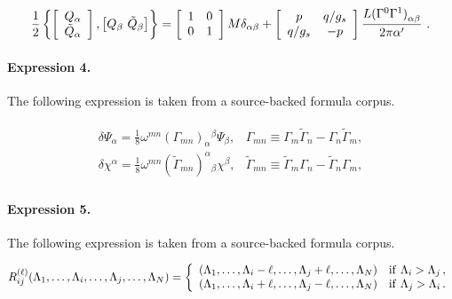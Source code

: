 \documentclass[11pt]{article}
\begin{document}
\begin{align*}{1\over2} \left\{ \left[ \begin{array}{c} Q_\alpha \\ \tilde Q_\alpha \end{array}\right] , \left[ Q_\beta\ \tilde Q_\beta \right] \right\}= \left[ \begin{array}{cc} 1&0 \\ 0&1 \end{array} \right] M\delta_{\alpha\beta} +\left[ \begin{array}{cc} p&q/g_s \\ q/g_s&-p \end{array} \right]{{L (\Gamma^0 \Gamma^1)}_{\alpha\beta}\over{2\pi{\alpha^\prime}}}\ .\end{align*}

\paragraph{Expression 4.} The following expression is taken from a source-backed formula corpus.

\begin{align*}\begin{array}{ll}\delta\Psi_\alpha=\displaystyle\frac 18\omega^{mn} (\Gamma_{mn})_\alpha{}^\beta\Psi_\beta, &\Gamma_{mn}\equiv\Gamma_m\tilde\Gamma_n-\Gamma_n\tilde\Gamma_m,\\\delta\chi^\alpha=\displaystyle\frac 18\omega^{mn}(\tilde\Gamma_{mn})^\alpha{}_\beta\chi^\beta, &\tilde\Gamma_{mn}\equiv\tilde\Gamma_m\Gamma_n-\tilde\Gamma_n\Gamma_m,\end{array}\end{align*}

\paragraph{Expression 5.} The following expression is taken from a source-backed formula corpus.

\begin{align*}R_{ij}^{(\ell)}(\Lambda_1,\dots,\Lambda_i,\dots,\Lambda_j,\dots,\Lambda_{N})=\left\{\begin{array}{ll}(\Lambda_1,\dots,\Lambda_i-\ell,\dots,\Lambda_j+\ell,\dots,\Lambda_{N}) &{\rm{if }} \, \, \Lambda_i > \Lambda_j\,, \cr(\Lambda_1,\dots,\Lambda_i+\ell,\dots,\Lambda_j-\ell,\dots,\Lambda_{N}) &{\rm{if }} \, \, \Lambda_j > \Lambda_i\,.\end{array}\right.\end{align*}
\end{document}
